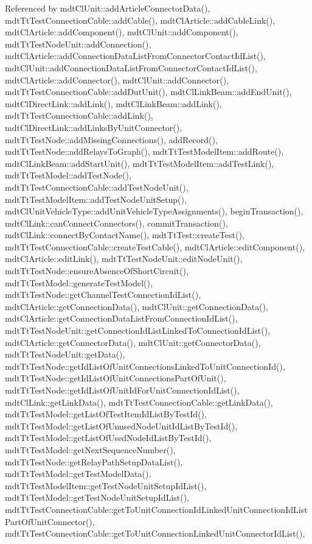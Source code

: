 Referenced by mdt\-Cl\-Unit\-::add\-Article\-Connector\-Data(), mdt\-Tt\-Test\-Connection\-Cable\-::add\-Cable(), mdt\-Cl\-Article\-::add\-Cable\-Link(), mdt\-Cl\-Article\-::add\-Component(), mdt\-Cl\-Unit\-::add\-Component(), mdt\-Tt\-Test\-Node\-Unit\-::add\-Connection(), mdt\-Cl\-Article\-::add\-Connection\-Data\-List\-From\-Connector\-Contact\-Id\-List(), mdt\-Cl\-Unit\-::add\-Connection\-Data\-List\-From\-Connector\-Contact\-Id\-List(), mdt\-Cl\-Article\-::add\-Connector(), mdt\-Cl\-Unit\-::add\-Connector(), mdt\-Tt\-Test\-Connection\-Cable\-::add\-Dut\-Unit(), mdt\-Cl\-Link\-Beam\-::add\-End\-Unit(), mdt\-Cl\-Direct\-Link\-::add\-Link(), mdt\-Cl\-Link\-Beam\-::add\-Link(), mdt\-Tt\-Test\-Connection\-Cable\-::add\-Link(), mdt\-Cl\-Direct\-Link\-::add\-Links\-By\-Unit\-Connector(), mdt\-Tt\-Test\-Node\-::add\-Missing\-Connections(), add\-Record(), mdt\-Tt\-Test\-Node\-::add\-Relays\-To\-Graph(), mdt\-Tt\-Test\-Model\-Item\-::add\-Route(), mdt\-Cl\-Link\-Beam\-::add\-Start\-Unit(), mdt\-Tt\-Test\-Model\-Item\-::add\-Test\-Link(), mdt\-Tt\-Test\-Model\-::add\-Test\-Node(), mdt\-Tt\-Test\-Connection\-Cable\-::add\-Test\-Node\-Unit(), mdt\-Tt\-Test\-Model\-Item\-::add\-Test\-Node\-Unit\-Setup(), mdt\-Cl\-Unit\-Vehicle\-Type\-::add\-Unit\-Vehicle\-Type\-Assignments(), begin\-Transaction(), mdt\-Cl\-Link\-::can\-Connect\-Connectors(), commit\-Transaction(), mdt\-Cl\-Link\-::connect\-By\-Contact\-Name(), mdt\-Tt\-Test\-::create\-Test(), mdt\-Tt\-Test\-Connection\-Cable\-::create\-Test\-Cable(), mdt\-Cl\-Article\-::edit\-Component(), mdt\-Cl\-Article\-::edit\-Link(), mdt\-Tt\-Test\-Node\-Unit\-::edit\-Node\-Unit(), mdt\-Tt\-Test\-Node\-::ensure\-Absence\-Of\-Short\-Circuit(), mdt\-Tt\-Test\-Model\-::generate\-Test\-Model(), mdt\-Tt\-Test\-Node\-::get\-Channel\-Test\-Connection\-Id\-List(), mdt\-Cl\-Article\-::get\-Connection\-Data(), mdt\-Cl\-Unit\-::get\-Connection\-Data(), mdt\-Cl\-Article\-::get\-Connection\-Data\-List\-From\-Connection\-Id\-List(), mdt\-Tt\-Test\-Node\-Unit\-::get\-Connection\-Id\-List\-Linked\-To\-Connection\-Id\-List(), mdt\-Cl\-Article\-::get\-Connector\-Data(), mdt\-Cl\-Unit\-::get\-Connector\-Data(), mdt\-Tt\-Test\-Node\-Unit\-::get\-Data(), mdt\-Tt\-Test\-Node\-::get\-Id\-List\-Of\-Unit\-Connections\-Linked\-To\-Unit\-Connection\-Id(), mdt\-Tt\-Test\-Node\-::get\-Id\-List\-Of\-Unit\-Connections\-Part\-Of\-Unit(), mdt\-Tt\-Test\-Node\-::get\-Id\-List\-Of\-Unit\-Id\-For\-Unit\-Connection\-Id\-List(), mdt\-Cl\-Link\-::get\-Link\-Data(), mdt\-Tt\-Test\-Connection\-Cable\-::get\-Link\-Data(), mdt\-Tt\-Test\-Model\-::get\-List\-Of\-Test\-Item\-Id\-List\-By\-Test\-Id(), mdt\-Tt\-Test\-Model\-::get\-List\-Of\-Unused\-Node\-Unit\-Id\-List\-By\-Test\-Id(), mdt\-Tt\-Test\-Model\-::get\-List\-Of\-Used\-Node\-Id\-List\-By\-Test\-Id(), mdt\-Tt\-Test\-Model\-::get\-Next\-Sequence\-Number(), mdt\-Tt\-Test\-Node\-::get\-Relay\-Path\-Setup\-Data\-List(), mdt\-Tt\-Test\-Model\-::get\-Test\-Model\-Data(), mdt\-Tt\-Test\-Model\-Item\-::get\-Test\-Node\-Unit\-Setup\-Id\-List(), mdt\-Tt\-Test\-Model\-::get\-Test\-Node\-Unit\-Setup\-Id\-List(), mdt\-Tt\-Test\-Connection\-Cable\-::get\-To\-Unit\-Connection\-Id\-Linked\-Unit\-Connection\-Id\-List\-Part\-Of\-Unit\-Connector(), mdt\-Tt\-Test\-Connection\-Cable\-::get\-To\-Unit\-Connection\-Linked\-Unit\-Connector\-Id\-List(), 